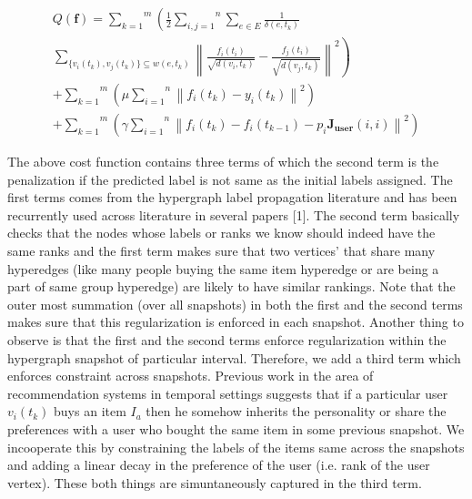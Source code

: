 \documentclass[conference]{IEEEtran}
\begin{document}
\begin{equation}
\begin{align}

Q(\mathbf{f}) = \overset{m}{\underset{k=1}{\sum}} \left ( \frac{1}{2} \overset{n}{\underset{i,j=1}{\sum}} \underset{e \in E}{\sum} \frac{1}{\delta(e,t_k)} \right. \\ \left. \underset{ \{v_i(t_k), v_j(t_k) \}{ \subseteq w(e,t_k)}}{\sum} \left \| \frac{f_i(t_i)}{\sqrt{d(v_i,t_k)}} - \frac{f_j(t_i)}{\sqrt{d(v_j,t_k)}} \right \|^{2} \right ) \\ + \overset{m}{\underset{k=1}{\sum}} \left( \mu \overset{n}{\underset{i=1}{\sum}} \left\|f_i(t_k) - y_i(t_k)\right\|^{2} \right ) 
\\ + \overset{m}{\underset{k=1}{\sum}} \left( \gamma \overset{n}{\underset{i=1}{\sum}} \left\|f_i(t_k) - f_i(t_{k-1}) - p_i \mathbf{J_{user}}(i,i)\right\|^{2} \right ) 

\end{align}
\end{equation}

The above cost function contains three terms of which the second term is the penalization if the predicted label is not same as the initial labels assigned. The first terms comes from the hypergraph label propagation literature \cite{Zhou06} and has been recurrently used across literature in several papers [1]\cite{kuang08}. The second term basically checks that the nodes whose labels or ranks we know should indeed have the same ranks and the first term makes sure that two vertices’ that share many hyperedges (like many people buying the same item hyperedge or are being a part of same group hyperedge) are likely to have similar rankings. Note that the outer most summation (over all snapshots) in both the first and the second terms makes sure that this regularization is enforced in each snapshot. Another thing to observe is that the first and the second terms enforce regularization within the hypergraph snapshot of particular interval. Therefore, we add a third term which enforces constraint across snapshots. Previous work in the area of recommendation systems \cite{koren10} in temporal settings suggests that if a particular user $v_i(t_k)$ buys an item $I_a$ then he somehow inherits the personality or share the preferences with a user who bought the same item in some previous snapshot. We incooperate this by constraining the labels of the items same across the snapshots and adding a linear decay in the preference of the user (i.e. rank of the user vertex). These both things are simuntaneously captured in the third term. 
\end{document}
